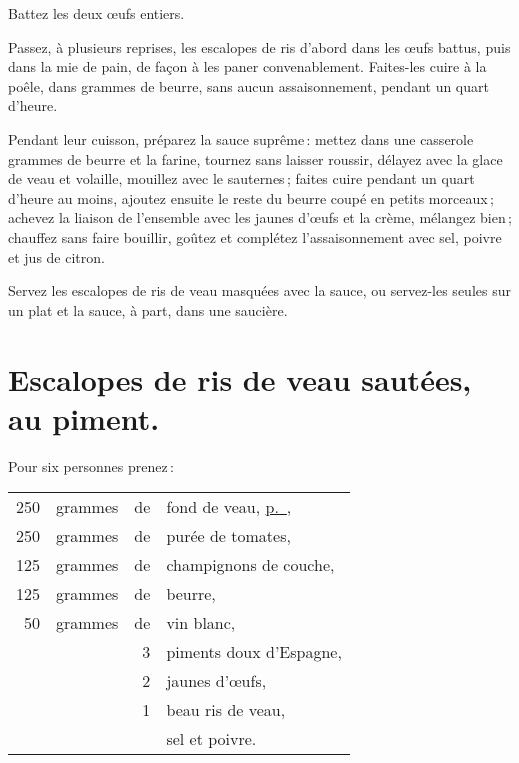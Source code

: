 Battez les deux œufs entiers.

Passez, à plusieurs reprises, les escalopes de ris d'abord dans les œufs
battus, puis dans la mie de pain, de façon à les paner convenablement.
Faites-les cuire à la poêle, dans {\mmm} grammes de beurre, sans aucun
assaisonnement, pendant un quart d'heure.

\label{pg0419} \hypertarget{p0419}{}
Pendant leur cuisson, préparez la sauce suprême : mettez dans une casserole
{\mmm} grammes de beurre et la farine, tournez sans laisser roussir,
délayez avec la glace de veau et volaille, mouillez avec le sauternes ; faites
cuire pendant un quart d'heure au moins, ajoutez ensuite le reste du beurre
coupé en petits morceaux ; achevez la liaison de l’ensemble avec les jaunes
d'œufs et la crème, mélangez bien ; chauffez sans faire bouillir, goûtez et
complétez l'assaisonnement avec sel, poivre et jus de citron.

Servez les escalopes de ris de veau masquées avec la sauce, ou servez-les
seules sur un plat et la sauce, à part, dans une saucière.

\section*{\centering Escalopes de ris de veau sautées, au piment.}
{}

Pour six personnes prenez :

\medskip

\footnotesize
\begin{longtable}{rrrp{18em}}
    250 & grammes & de & fond de veau, \hyperlink{p0426}{p. \pageref{pg0426}},                            \\
    250 & grammes & de & purée de tomates,                                                                \\
    125 & grammes & de & champignons de couche,                                                           \\
    125 & grammes & de & beurre,                                                                          \\
     50 & grammes & de & vin blanc,                                                                       \\
        &         &  3 & piments doux d'Espagne,                                                          \\
        &         &  2 & jaunes d'œufs,                                                                   \\
        &         &  1 & beau ris de veau,                                                                \\
        &         &    & sel et poivre.                                                                   \\
\end{longtable}
\normalsize

